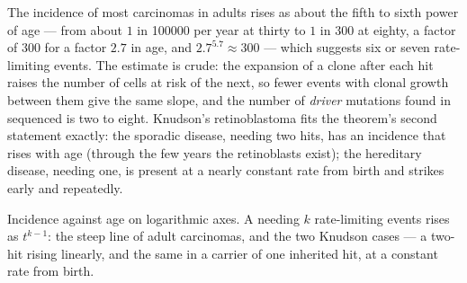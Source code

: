 \begin{example}\label{ex:b3:cancer-biology:exponent}
The incidence of most carcinomas in adults rises as about the fifth to
sixth power of age --- from about $1$ in \num{100000} per year at
thirty to $1$ in $300$ at eighty, a factor of $300$ for a factor $2.7$
in age, and $2.7^{5.7} \approx 300$ --- which suggests six or seven
rate-limiting events. The estimate is crude: the expansion of a clone
after each hit raises the number of cells at risk of the next, so fewer
events with clonal growth between them give the same slope, and the
number of \emph{driver} mutations found in sequenced  is two to
eight. Knudson's retinoblastoma fits the theorem's second statement
exactly: the sporadic disease, needing two hits, has an incidence that
rises with age (through the few years the retinoblasts exist); the
hereditary disease, needing one, is present at a nearly constant rate
from birth and strikes early and repeatedly.
\end{example}

\begin{omfigure}

{\small Incidence against age on logarithmic axes. A  needing $k$
rate-limiting events rises as $t^{k-1}$: the steep line of adult
carcinomas, and the two Knudson cases --- a two-hit  rising
linearly, and the same  in a carrier of one inherited hit, at a
constant rate from birth.}
\end{omfigure}

